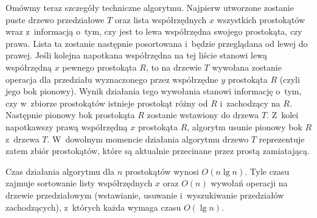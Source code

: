 Omówmy teraz szczegóły techniczne algorytmu.
Najpierw utworzone zostanie puste drzewo przedziałowe $T$ oraz lista współrzędnych $x$ wszystkich prostokątów wraz z~informacją o~tym, czy jest to lewa współrzędna swojego prostokąta, czy prawa.
Lista ta zostanie następnie posortowana i~będzie przeglądana od lewej do prawej.
Jeśli kolejna napotkana współrzędna na tej liście stanowi lewą współrzędną $x$ pewnego prostokąta $R$, to na drzewie $T$ wywołana zostanie operacja  dla przedziału wyznaczonego przez współrzędne $y$ prostokąta $R$ (czyli jego bok pionowy).
Wynik działania tego wywołania stanowi informację o~tym, czy w~zbiorze prostokątów istnieje prostokąt różny od $R$ i~zachodzący na $R$.
Następnie pionowy bok prostokąta $R$ zostanie wstawiony do drzewa $T$.
Z~kolei napotkawszy prawą współrzędną $x$ prostokąta $R$, algorytm usunie pionowy bok $R$ z~drzewa $T$.
W~dowolnym momencie działania algorytmu drzewo $T$ reprezentuje zatem zbiór prostokątów, które są aktualnie przecinane przez prostą zamiatającą.

Czas działania algorytmu dla $n$ prostokątów wynosi $O(n\lg n)$.
Tyle czasu zajmuje sortowanie listy współrzędnych $x$ oraz $O(n)$ wywołań operacji na drzewie przedziałowym (wstawianie, usuwanie i~wyszukiwanie przedziałów zachodzących), z~których każda wymaga czasu $O(\lg n)$.
